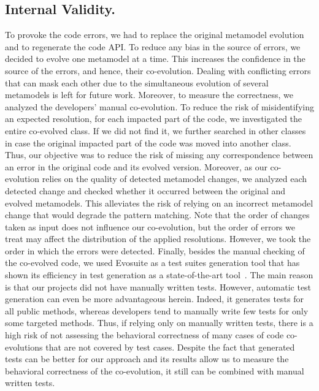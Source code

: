 	\subsection{Internal Validity.} To provoke the code errors, we had to replace the original metamodel evolution and to regenerate the code API. To reduce any bias in the source of errors, we decided to evolve one metamodel at a time. This increases the confidence in the source of the errors, and hence, their co-evolution. Dealing with conflicting errors that can mask each other due to the simultaneous evolution of several metamodels is left for future work.  
	Moreover, to measure the correctness, we analyzed the developers' manual co-evolution.
	To reduce the risk of misidentifying an expected resolution, for each impacted part of the code, we investigated the entire co-evolved class. If we did not find it, we further searched in other classes in case the original impacted part of the code was moved into another class. Thus, our objective was to reduce the risk of missing any correspondence between an error in the original code and its evolved version. Moreover, as our co-evolution relies on the quality of detected metamodel changes, we analyzed each detected change and checked whether it occurred between the original and evolved metamodels. This alleviates the risk of relying on an incorrect metamodel change that would degrade the pattern matching. 
	Note that the order of changes taken as input does not influence our co-evolution, but the order of errors we treat may affect the distribution of the applied resolutions. However, we took the order in which the errors were detected. 
	Finally, besides the manual checking of the co-evolved code, we used Evosuite as a test suites generation tool that has shown its efficiency in
	test generation as a state-of-the-art tool~\cite{DANGLOT2019110398,https://doi.org/10.1002/stvr.1601}. The main reason is that our projects did not have manually written tests. However, automatic test
	generation can even be more advantageous herein. Indeed, it generates tests for all
	public methods, whereas developers tend to manually write few tests for only some targeted methods. Thus, if relying only on manually written tests, there is a high risk of not assessing the behavioral correctness of many cases of code co-evolutions that are not covered by test cases. Despite the fact that generated tests can be better for our approach and its results allow us to measure the behavioral correctness of the co-evolution, %
it still can be combined with manual written tests.


